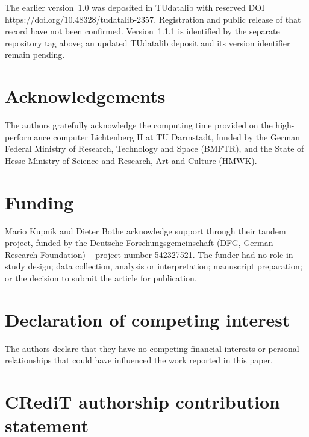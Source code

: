 \documentclass[final,12pt,nopreprintline,longtitle]{elsarticle}
\begin{document}
The earlier version~1.0 was deposited in TUdatalib with reserved DOI
\url{https://doi.org/10.48328/tudatalib-2357}.  Registration and public
release of that record have not been confirmed.  Version~1.1.1 is identified
by the separate repository tag above; an updated TUdatalib deposit and its
version identifier remain pending.

\section*{Acknowledgements}

The authors gratefully acknowledge the computing time provided on the
high-performance computer Lichtenberg II at TU Darmstadt, funded by the
German Federal Ministry of Research, Technology and Space (BMFTR), and the
State of Hesse Ministry of Science and Research, Art and Culture (HMWK).

\section*{Funding}

Mario Kupnik and Dieter Bothe acknowledge support through their tandem
project, funded by the Deutsche Forschungsgemeinschaft (DFG, German Research
Foundation) -- project number 542327521.
The funder had no role in study design; data collection, analysis or
interpretation; manuscript preparation; or the decision to submit the article
for publication.

\section*{Declaration of competing interest}

The authors declare that they have no competing financial interests or
personal relationships that could have influenced the work reported in this
paper.

\section*{CRediT authorship contribution statement}
\end{document}

